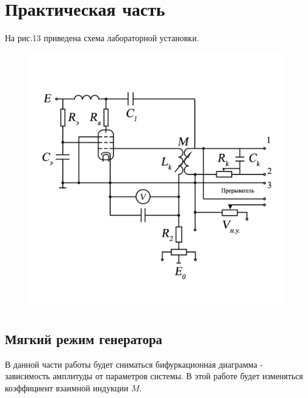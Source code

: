 \begin{center}
\begin{figure}[H]
\begin{minipage}{0.49\linewidth}
        \vspace{-50pt}
        \label{fig:11}
    \end{minipage}
    \caption{}
    \vspace{-40pt}
    \end{figure}
\end{center} 

\newpage
\section{Практическая часть}
На рис.13 приведена схема лабораторной установки.

\begin{center}
    \begin{figure}[H]
        \vspace{-10pt}
            \includegraphics[width=\linewidth]{pics/scheme.png} 
            \vspace{-50pt}
            \label{fig:10}
    \end{figure}
\end{center} 
\subsection{Мягкий режим генератора}
В данной части работы будет сниматься бифуркационная диаграмма - зависимость амплитуды от параметров системы. 
В этой работе будет изменяться коэффициент взаимной индукции $M$.

